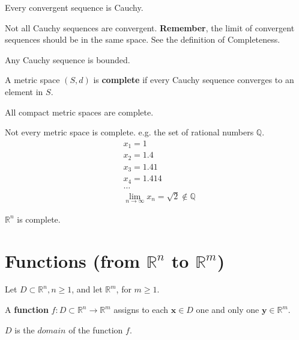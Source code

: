 \begin{proposition}
    Every convergent sequence is Cauchy.
\end{proposition}

\begin{remark*}
    Not all Cauchy sequences are convergent. \textbf{Remember}, the limit of convergent sequences should be in the same space. See the definition of Completeness.
\end{remark*}

\begin{lemma}
    Any Cauchy sequence is bounded.
\end{lemma}

\begin{definition}[Complete]
    A metric space $(S,d)$ is \textbf{complete} if every Cauchy sequence converges to an element in $S$.
\end{definition}

\begin{proposition}
    All compact metric spaces are complete.
\end{proposition}

\begin{remark*}
    Not every metric space is complete. e.g. the set of rational numbers $\mathbb{Q}$.\begin{align*}
         & x_1 = 1                                              \\
         & x_2 = 1.4                                            \\
         & x_3 = 1.41                                           \\
         & x_4 = 1.414                                          \\
         & \dots                                                \\
         & \lim_{n \to \infty} x_n = \sqrt{2} \notin \mathbb{Q}
    \end{align*}
\end{remark*}

\begin{proposition}
    $\mathbb{R}^{n}$ is complete.
\end{proposition}

\section{Functions (from $\mathbb{R}^{n}$ to $\mathbb{R}^{m}$)}

\begin{definition}
    Let  $D \subset \mathbb{R}^{n}, n \geq 1$, and let  $\mathbb{R}^{m}$, for  $m \geq 1$.

    A \textbf{function} $f:D \subset \mathbb{R}^{n} \to \mathbb{R}^{m}$ assigns to each $\mathbf{x} \in D$ one and only one $\mathbf{y} \in \mathbb{R}^{m}$.

    $D$ is the $domain$ of the function $f$.
\end{definition}

